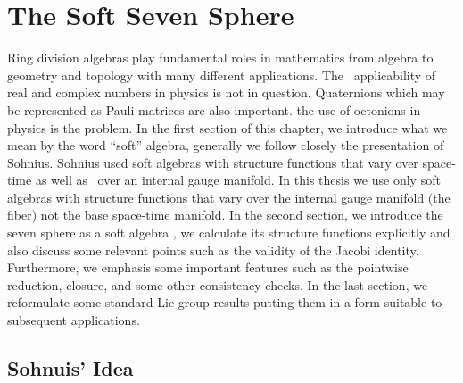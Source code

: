 \documentclass[a4paper,12pt]{book}
\begin{document}
\chapter{The Soft Seven Sphere}

Ring division algebras play fundamental roles in mathematics from algebra to
geometry and topology with many different applications. The \ applicability
of real and complex numbers in physics is not in question. Quaternions which
may be represented as Pauli matrices are also important. the use of
octonions in physics is the problem. In the first section of this chapter,
we introduce what we mean by the word ``soft'' algebra, generally we follow
closely the presentation of Sohnius\cite{soh}. Sohnius used soft algebras
with structure functions that vary over space-time as well as \ over an
internal gauge manifold. In this thesis we use only soft algebras with
structure functions that vary over the internal gauge manifold (the fiber)
not the base space-time manifold. In the second section, we introduce the
seven sphere as a soft algebra \cite{estps}, we calculate its structure
functions explicitly and also discuss some relevant points such as the
validity of the Jacobi identity. Furthermore, we emphasis some important
features such as the pointwise reduction, closure, and some other
consistency checks. In the last section, we reformulate some standard Lie
group results putting them in a form suitable to subsequent applications.

\section{Sohnuis' Idea}
\end{document}
